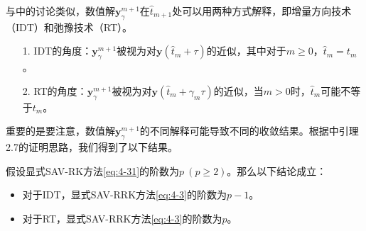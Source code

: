 与\cite{ketchesonRelaxationRungeKutta2019}中的讨论类似，数值解$\bm{y}_\gamma^{m+1}$在$\hat{t}_{m+1}$处可以用两种方式解释，即增量方向技术（IDT）和弛豫技术（RT）。
\begin{itemize}
\item[1.] IDT的角度：$\bm{y}_\gamma^{m+1}$被视为对$\bm{y}\left(\hat{t}_m+\tau\right)$的近似，其中对于$m \geq 0$，$\hat{t}_m=t_m$。
\item[2.] RT的角度：$\bm{y}_\gamma^{m+1}$被视为对$\bm{y}\left(\hat{t}_m+\gamma_m \tau\right)$的近似，当$m>0$时，$\hat{t}_m$可能不等于$t_m$。
\end{itemize}

重要的是要注意，数值解$\bm{y}_\gamma^{m+1}$的不同解释可能导致不同的收敛结果。根据\cite{ranochaGeneralRelaxationMethods2020}中引理2.7的证明思路，我们得到了以下结果。

\begin{theorem}\label{thm:5_4}
假设显式SAV-RK方法\eqref{eq:4-31}的阶数为$p~(p \geq 2)$。那么以下结论成立：
\begin{itemize}
\item 对于IDT，显式SAV-RRK方法\eqref{eq:4-3}的阶数为$p-1$。
\item 对于RT，显式SAV-RRK方法\eqref{eq:4-3}的阶数为$p$。
\end{itemize}
\end{theorem}


